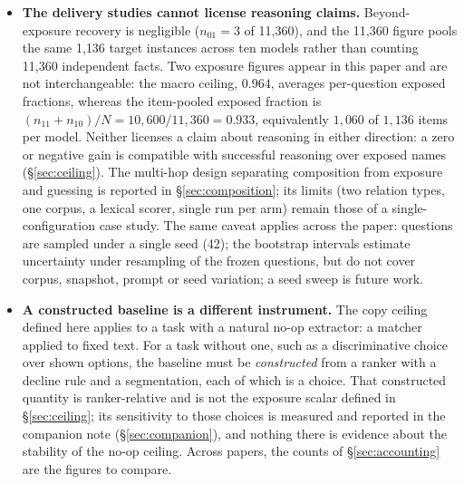 \documentclass[10pt,twocolumn]{article}
\begin{document}
\begin{itemize}[topsep=2pt,itemsep=2pt,leftmargin=1.4em]
\item \textbf{The delivery studies cannot license reasoning claims.} Beyond-exposure recovery is negligible ($n_{01}=3$ of 11{,}360), and the 11{,}360 figure pools the same 1{,}136 target instances across ten models rather than counting 11{,}360 independent facts. Two exposure figures appear in this paper and are not interchangeable: the macro ceiling, $0.964$, averages per-question exposed fractions, whereas the item-pooled exposed fraction is $(n_{11}+n_{10})/N=10{,}600/11{,}360=0.933$, equivalently $1{,}060$ of $1{,}136$ items per model. Neither licenses a claim about reasoning in either direction: a zero or negative gain is compatible with successful reasoning over exposed names (\S\ref{sec:ceiling}). The multi-hop design separating composition from exposure and guessing is reported in \S\ref{sec:composition}; its limits (two relation types, one corpus, a lexical scorer, single run per arm) remain those of a single-configuration case study. The same caveat applies across the paper: questions are sampled under a single seed (42); the bootstrap intervals estimate uncertainty under resampling of the frozen questions, but do not cover corpus, snapshot, prompt or seed variation; a seed sweep is future work.
\item \textbf{A constructed baseline is a different instrument.} The copy ceiling defined here applies to a task with a natural no-op extractor: a matcher applied to fixed text. For a task without one, such as a discriminative choice over shown options, the baseline must be \emph{constructed} from a ranker with a decline rule and a segmentation, each of which is a choice. That constructed quantity is ranker-relative and is not the exposure scalar defined in \S\ref{sec:ceiling}; its sensitivity to those choices is measured and reported in the companion note (\S\ref{sec:companion}), and nothing there is evidence about the stability of the no-op ceiling. Across papers, the counts of \S\ref{sec:accounting} are the figures to compare.

\end{itemize}
\end{document}

